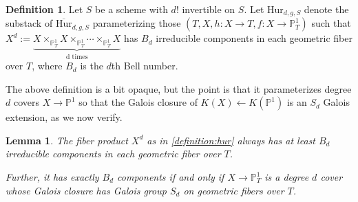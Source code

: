 \documentclass[12 pt]{amsart}
\newcommand{\rboxed}[1]{#1}
\theoremstyle{plain}
\newtheorem{lemma}[theorem]{Lemma}
\theoremstyle{definition}
\newtheorem{definition}[theorem]{Definition}
\theoremstyle{remark}
\numberwithin{equation}{section}
\newcommand\bp{\mathbb P}
\newcommand\bighurg[3]{\overline{\mathrm{Hur}}_{#1,#2, #3}} %
\newcommand\hur[3]{\mathrm{Hur}_{#1,#2,#3}} %
\begin{document}
\begin{definition} \label{definition:hur} Let $S$ be a scheme with $d!$
		invertible on $S$.  Let $\rboxed{\hur d g S}$ denote the
		substack of $\bighurg d g S$ parameterizing those $(T, X, h: X
		\to T, f: X \to \bp^1_T)$ such that
		$X^d := \underbrace{X \times_{\bp^1_T} X
		\times_{\bp^1_T} \cdots \times_{\bp^1_T} X}_{\text{d times}}$ 
		has $B_d$ irreducible components in each geometric fiber over
		$T$, where $B_d$ is the $d$th Bell number.
\end{definition} 

The above definition is a bit opaque, but the point is that it parameterizes
degree $d$ covers $X \to \bp^1$ so that the Galois closure of $K(X)
\leftarrow
K(\bp^1)$ is an $S_d$ Galois extension, as we now verify.

\begin{lemma}
	\label{lemma:hur-sd-covers}
	The fiber product $X^d$ as in \autoref{definition:hur}
	always has at least $B_d$ irreducible components in each geometric fiber
	over $T$.

	Further, it has exactly $B_d$ components if and only if 
	$X \to \bp^1_T$ is a degree $d$ cover whose Galois closure has Galois
	group $S_d$ on geometric fibers over $T$.
	\end{lemma}
\end{document}
